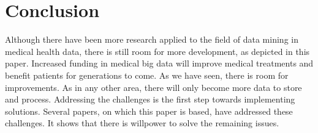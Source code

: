  
\section{Conclusion}
Although there have been more research applied to the field of data mining in medical health data, there is still room for more development, as depicted in this paper. Increased funding in medical big data will improve medical treatments and benefit patients for generations to come. As we have seen, there is room for improvements. As in any other area, there will only become more data to store and process. Addressing the challenges is the first step towards implementing solutions. Several papers, on which this paper is based, have addressed these challenges. It shows that there is willpower to solve the remaining issues. 











